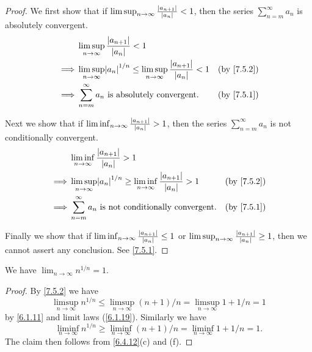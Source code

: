 \begin{proof}
  We first show that if \(\limsup_{n \to \infty} \frac{\left\lvert a_{n + 1}\right\rvert}{\left\lvert a_n\right\rvert} < 1\), then the series \(\sum_{n = m}^\infty a_n\) is absolutely convergent.
  \begin{align*}
             & \limsup_{n \to \infty} \frac{\abs{a_{n + 1}}}{\abs{a_n}} < 1                                                                          \\
    \implies & \limsup_{n \to \infty} \abs{a_n}^{1 / n} \leq \limsup_{n \to \infty} \frac{\abs{a_{n + 1}}}{\abs{a_n}} < 1 & \text{(by \cref{7.5.2})} \\
    \implies & \sum_{n = m}^\infty a_n \text{ is absolutely convergent}.                                                  & \text{(by \cref{7.5.1})}
  \end{align*}

  Next we show that if \(\liminf_{n \to \infty} \frac{\left\lvert a_{n + 1}\right\rvert}{\left\lvert a_n\right\rvert} > 1\), then the series \(\sum_{n = m}^\infty a_n\) is not conditionally convergent.
  \begin{align*}
             & \liminf_{n \to \infty} \frac{\abs{a_{n + 1}}}{\abs{a_n}} > 1                                                                          \\
    \implies & \limsup_{n \to \infty} \abs{a_n}^{1 / n} \geq \liminf_{n \to \infty} \frac{\abs{a_{n + 1}}}{\abs{a_n}} > 1 & \text{(by \cref{7.5.2})} \\
    \implies & \sum_{n = m}^\infty a_n \text{ is not conditionally convergent}.                                           & \text{(by \cref{7.5.1})}
  \end{align*}

  Finally we show that if \(\liminf_{n \to \infty} \frac{\left\lvert a_{n + 1}\right\rvert}{\left\lvert a_n\right\rvert} \leq 1\) or \(\limsup_{n \to \infty} \frac{\left\lvert a_{n + 1}\right\rvert}{\left\lvert a_n\right\rvert} \geq 1\), then we cannot assert any conclusion.
  See \cref{7.5.1}.
\end{proof}

\begin{proposition}\label{7.5.4}
  We have \(\lim_{n \to \infty} n^{1 / n} = 1\).
\end{proposition}

\begin{proof}
  By \cref{7.5.2} we have
  \[
    \limsup_{n \to \infty} n^{1 / n} \leq \limsup_{n \to \infty} (n + 1) / n = \limsup_{n \to \infty} 1 + 1 / n = 1
  \]
  by \cref{6.1.11} and limit laws (\cref{6.1.19}).
  Similarly we have
  \[
    \liminf_{n \to \infty} n^{1 / n} \geq \liminf_{n \to \infty} (n + 1) / n = \liminf_{n \to \infty} 1 + 1 / n = 1.
  \]
  The claim then follows from \cref{6.4.12}(c) and (f).
\end{proof}

